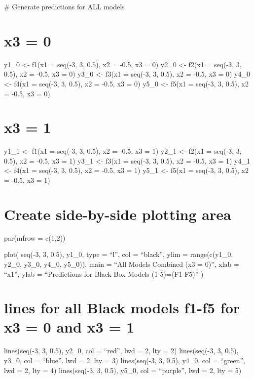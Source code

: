 \documentclass[
  letterpaper,
  DIV=11,
  numbers=noendperiod]{scrreprt}
\begin{document}
\# Generate predictions for ALL models


\chapter{x3 = 0}\label{x3-0}

y1\_0 \textless- f1(x1 = seq(-3, 3, 0.5), x2 = -0.5, x3 = 0) y2\_0
\textless- f2(x1 = seq(-3, 3, 0.5), x2 = -0.5, x3 = 0) y3\_0 \textless-
f3(x1 = seq(-3, 3, 0.5), x2 = -0.5, x3 = 0) y4\_0 \textless- f4(x1 =
seq(-3, 3, 0.5), x2 = -0.5, x3 = 0) y5\_0 \textless- f5(x1 = seq(-3, 3,
0.5), x2 = -0.5, x3 = 0)


\chapter{x3 = 1}\label{x3-1}

y1\_1 \textless- f1(x1 = seq(-3, 3, 0.5), x2 = -0.5, x3 = 1) y2\_1
\textless- f2(x1 = seq(-3, 3, 0.5), x2 = -0.5, x3 = 1) y3\_1 \textless-
f3(x1 = seq(-3, 3, 0.5), x2 = -0.5, x3 = 1) y4\_1 \textless- f4(x1 =
seq(-3, 3, 0.5), x2 = -0.5, x3 = 1) y5\_1 \textless- f5(x1 = seq(-3, 3,
0.5), x2 = -0.5, x3 = 1)


\chapter{Create side-by-side plotting
area}\label{create-side-by-side-plotting-area}

par(mfrow = c(1,2))

plot( seq(-3, 3, 0.5), y1\_0, type = ``l'', col = ``black'', ylim =
range(c(y1\_0, y2\_0, y3\_0, y4\_0, y5\_0)), main = ``All Models
Combined (x3 = 0)'', xlab = ``x1'', ylab = ``Predictions for Black Box
Models (1-5)=(F1-F5)'' )


\chapter{lines for all Black models f1-f5 for x3 = 0 and x3 =
1}\label{lines-for-all-black-models-f1-f5-for-x3-0-and-x3-1}

lines(seq(-3, 3, 0.5), y2\_0, col = ``red'', lwd = 2, lty = 2)
lines(seq(-3, 3, 0.5), y3\_0, col = ``blue'', lwd = 2, lty = 3)
lines(seq(-3, 3, 0.5), y4\_0, col = ``green'', lwd = 2, lty = 4)
lines(seq(-3, 3, 0.5), y5\_0, col = ``purple'', lwd = 2, lty = 5)
\end{document}
